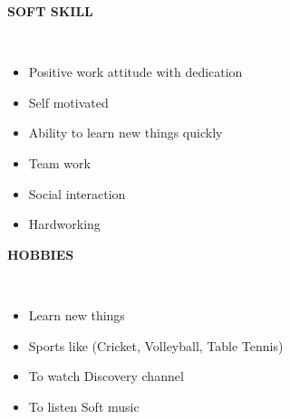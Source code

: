 \documentclass[a4paper,10pt]{article}
\newcommand{\lsep}{-0.5cm}
\newcommand{\resheading}[1]{{\small \colorbox{mygrey}{\begin{minipage}{0.975\textwidth}{\textbf{#1 \vphantom{p\^{E}}}}\end{minipage}}}}
\begin{document}
\resheading{\textbf{SOFT SKILL} }\\[\lsep]
\begin{itemize}
\item \noindent Positive work attitude with dedication 
\item\noindent Self motivated 
\item\noindent Ability to learn new things quickly
\item\noindent Team work
\item\noindent Social interaction
\item\noindent Hardworking
\end{itemize}

\resheading{\textbf{HOBBIES} }\\[\lsep]
\begin{itemize}
\item \noindent Learn new things
\item \noindent Sports like (Cricket, Volleyball, Table Tennis)
\item \noindent To watch Discovery channel 
\item \noindent To listen Soft music  
\end{itemize} 
\end{document}
